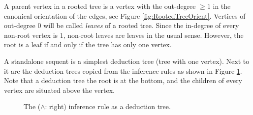 A parent vertex in a rooted tree is a vertex with the out-degree $\ge 1$ in the canonical orientation of the edges, see Figure \ref{fig:RootedTreeOrient}.
Vertices of out-degree $0$ will be called \emph{leaves} of a rooted tree.
Since the in-degree of every non-root vertex is $1$, non-root leaves are leaves in the usual sense.
However, the root is a leaf if and only if the tree has only one vertex.

A standalone sequent is a simplest deduction tree (tree with one vertex).
Next to it are the deduction trees copied from the inference rules as shown in Figure \ref{fig:DeductionTree}.
Note that a deduction tree the root is at the bottom, and the children of every vertex are situated above the vertex.

\begin{figure}[ht]
\begin{center}
\hspace{1cm}

\end{center}
\caption{The ($\wedge$: right) inference rule as a deduction tree.}
\label{fig:DeductionTree}
\end{figure}
